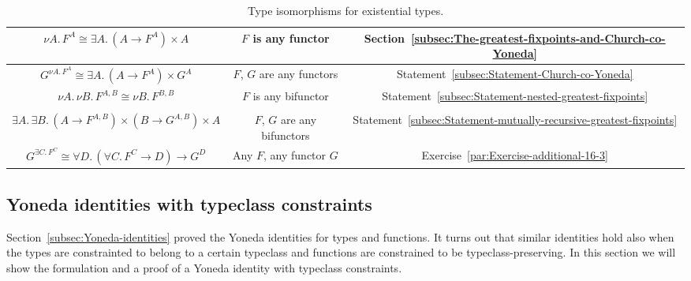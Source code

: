 \begin{table}[h]
\begin{centering}
\begin{tabular}{|c|c|c|}
\hline 
{\footnotesize{}$\nu A.\,F^{A}\cong\exists A.\,(A\rightarrow F^{A})\times A$} & {\footnotesize{}$F$ is any functor} & {\footnotesize{}Section~\ref{subsec:The-greatest-fixpoints-and-Church-co-Yoneda}}\tabularnewline
\hline 
{\footnotesize{}$G^{\nu A.\,F^{A}}\cong\exists A.\,(A\rightarrow F^{A})\times G^{A}$} & {\footnotesize{}$F$, $G$ are any functors} & {\footnotesize{}Statement~\ref{subsec:Statement-Church-co-Yoneda}}\tabularnewline
\hline 
{\footnotesize{}$\nu A.\,\nu B.\,F^{A,B}\cong\nu B.\,F^{B,B}$} & {\footnotesize{}$F$ is any bifunctor} & {\footnotesize{}Statement~\ref{subsec:Statement-nested-greatest-fixpoints}}\tabularnewline
\hline 
{\footnotesize{}}%
\begin{minipage}[c][12mm][t]{0.1mm}%
%
\end{minipage}{\footnotesize{}}%
\begin{minipage}[c]{0.43\columnwidth}%
\begin{center}
{\footnotesize{}$\nu A.\,F^{A,\,\nu B.\,G^{A,B}}\cong$}\\
{\footnotesize{}$\exists A.\,\exists B.\,(A\rightarrow F^{A,B})\times(B\rightarrow G^{A,B})\times A$}
\par\end{center}%
\end{minipage} & {\footnotesize{}$F$, $G$ are any bifunctors} & {\footnotesize{}Statement~\ref{subsec:Statement-mutually-recursive-greatest-fixpoints}}\tabularnewline
\hline 
{\footnotesize{}$G^{\exists C.\,F^{C}}\cong\forall D.\,(\forall C.\,F^{C}\rightarrow D)\rightarrow G^{D}$} & {\footnotesize{}Any $F$, any functor $G$} & {\footnotesize{}Exercise~\ref{par:Exercise-additional-16-3}}\tabularnewline
\hline 
\end{tabular}
\par\end{centering}
\caption{Type isomorphisms for existential types.\label{tab:Type-identities-for-existential-types}}
\end{table}


\subsection{Yoneda identities with typeclass constraints}

Section~\ref{subsec:Yoneda-identities} proved the Yoneda identities
for types and functions. It turns out that similar identities hold
also when the types are constrainted to belong to a certain typeclass
and functions are constrained to be typeclass-preserving. In this
section we will show the formulation and a proof of a Yoneda identity
with typeclass constraints.

